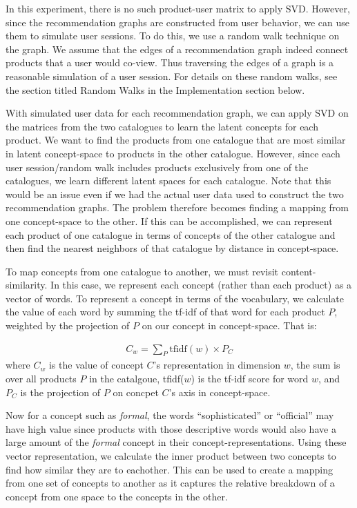 \documentclass[11pt]{article}
\begin{document}
In this experiment, there is no such product-user matrix to apply SVD.
However, since the recommendation graphs are constructed from user behavior,
we can use them to simulate user sessions. To do this, we use a random walk 
technique on the graph. We assume that the edges of a recommendation graph 
indeed connect products that a user would co-view. Thus traversing the edges 
of a graph is a reasonable simulation of a user session. For details on these
random walks, see the section titled Random Walks in the Implementation section
below.

With simulated user data for each recommendation graph, we can apply SVD on the
matrices from the two catalogues to learn the latent concepts for each product.
We want to find the products from one catalogue that are most similar in latent
concept-space to products in the other catalogue. However, since each user
session/random walk includes products exclusively from one of the catalogues, we
learn different latent spaces for each catalogue. Note that this would be an
issue even if we had the actual user data used to construct the two
recommendation graphs. The problem therefore becomes finding a mapping from one
concept-space to the other. If this can be accomplished, we can represent each
product of one catalogue in terms of concepts of the other catalogue and then
find the nearest neighbors of that catalogue by distance in concept-space. 

To map concepts from one catalogue to another, we must revisit
content-similarity. In this case, we represent each concept (rather than each
product) as a vector of words. To represent a concept in terms of the
vocabulary, we calculate the value of each word by summing the
tf-idf of that word for each product $P$, weighted by the projection of $P$ on
our concept in concept-space. That is:

\begin{align}
C_w = \sum\limits_{P} \text{tfidf}(w)\times P_C
\end{align}
where $C_w$ is the value of concept $C$'s representation in dimension $w$, the sum 
is over all products $P$ in the catalgoue, tfidf($w$) is the tf-idf score for
word $w$, and $P_C$ is the projection of $P$ on concpet $C$'s axis in
concept-space.

Now for a concept such as {\em formal}, the words ``sophisticated'' or
``official'' may have high value since products with those descriptive words
would also have a large amount of the {\em formal} concept in their
concept-representations. Using these vector representation, we calculate the
inner product between two concepts to find how similar they are to eachother.
This can be used to create a mapping from one set of concepts to another as it
captures the relative breakdown of a concept from one space to the concepts in the
other.
\end{document}
